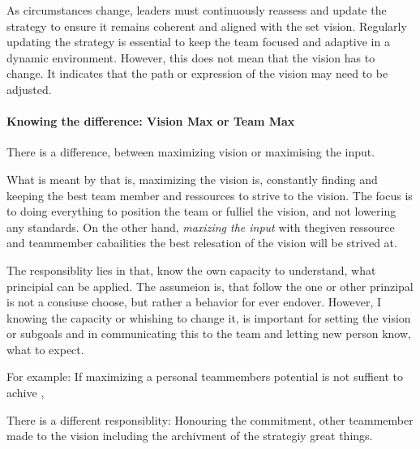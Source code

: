 As circumstances change, leaders must continuously reassess and update the strategy to ensure it remains coherent and aligned with the set vision. Regularly updating the strategy is essential to keep the team focused and adaptive in a dynamic environment. However, this does not mean that the vision has to change. It indicates that the path or expression of the vision may need to be adjusted.

\paragraph{Knowing the difference: Vision Max or Team Max}
There is a difference, between maximizing vision or maximising the input.

What is meant by that is, maximizing the vision is, constantly finding and keeping the best team member and ressources to strive to the vision. The focus is to doing everything to position the team or fulliel the vision, and not lowering any standards. On the other hand, \textit{maxizing the input} with thegiven ressource and teammember cabailities the best relesation of the vision will be strived at.

The responsiblity lies in that, know the own capacity to understand, what principial can be applied. The assumeion is, that follow the one or other prinzipal is not a consiuse choose, but rather a behavior for ever endover. However, I knowing the capacity or whishing to change it, is important for setting the vision or subgoals and in communicating this to the team and letting new person know, what to expect.

For example: If maximizing a personal teammembers potential is not suffient to achive ,


There is a different responsiblity: Honouring the commitment, other teammember made to the vision including the archivment of the strategiy great things.




